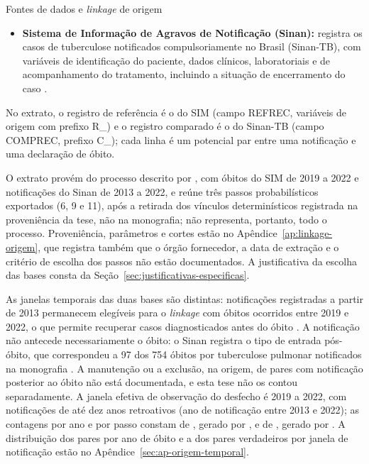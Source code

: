\begin{chapter}{Fontes de dados e \textit{linkage} de origem}
\begin{itemize}
\item \textbf{Sistema de Informação de Agravos de Notificação (Sinan):} registra os casos de tuberculose notificados compulsoriamente no Brasil (Sinan-TB), com variáveis de identificação do paciente, dados clínicos, laboratoriais e de acompanhamento do tratamento, incluindo a situação de encerramento do caso \cite{Rocha2019scripting}.
\end{itemize}

No extrato, o registro de referência é o do SIM (campo REFREC, variáveis de origem com prefixo R\_) e o registro comparado é o do Sinan-TB (campo COMPREC, prefixo C\_); cada linha é um potencial par entre uma notificação e uma declaração de óbito.

O extrato provém do processo descrito por , com óbitos do SIM de 2019 a 2022 e notificações do Sinan de 2013 a 2022, e reúne três passos probabilísticos exportados (6, 9 e 11), após a retirada dos vínculos determinísticos registrada na proveniência da tese, não na monografia; não representa, portanto, todo o processo. Proveniência, parâmetros e cortes estão no Apêndice~\ref{ap:linkage-origem}, que registra também que o órgão fornecedor, a data de extração e o critério de escolha dos passos não estão documentados. A justificativa da escolha das bases consta da Seção~\ref{sec:justificativas-especificas}.

As janelas temporais das duas bases são distintas: notificações registradas a partir de 2013 permanecem elegíveis para o \textit{linkage} com óbitos ocorridos entre 2019 e 2022, o que permite recuperar casos diagnosticados antes do óbito \cite[p.~33]{Oliveira2026obitoTBpulmonar}. A notificação não antecede necessariamente o óbito: o Sinan registra o tipo de entrada pós-óbito, que correspondeu a 97 dos 754 óbitos por tuberculose pulmonar notificados na monografia \cite[p.~23 e~45]{Oliveira2026obitoTBpulmonar}. A manutenção ou a exclusão, na origem, de pares com notificação posterior ao óbito não está documentada, e esta tese não os contou separadamente. A janela efetiva de observação do desfecho é 2019 a 2022, com notificações de até dez anos retroativos (ano de notificação entre 2013 e 2022); as contagens por ano e por passo constam de , gerado por , e de , gerado por . A distribuição dos pares por ano de óbito e a dos pares verdadeiros por janela de notificação estão no Apêndice~\ref{sec:ap-origem-temporal}.


\end{chapter}
